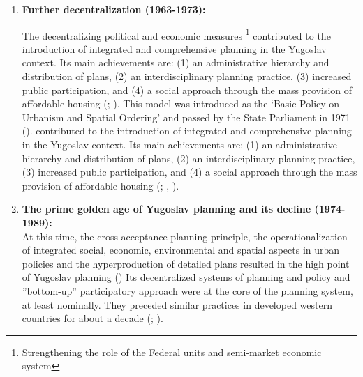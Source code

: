 \documentclass[11pt]{report}
\begin{document}
\begin{enumerate}
\item \textbf{Further decentralization (1963-1973):}

The decentralizing political and economic measures
\footnote{Strengthening the role of the Federal units and semi-market economic system}
contributed to the introduction of integrated and comprehensive planning in the Yugoslav context. Its main achievements are: (1) an administrative hierarchy and distribution of plans, (2) an interdisciplinary planning practice, (3) increased public participation, and (4) a social approach through the mass provision of affordable housing (\href{Vesna}{\citealt{cagic_zakoni_2014}}; \href{Peric}{ \citealt{peric_evolution_2016}}). This model was introduced as the ‘Basic Policy on Urbanism and Spatial Ordering’ and passed by the State Parliament in 1971 (\href{Nedovic}{\citealt{nedovicbudic_waves_2006}}).
contributed to the introduction of integrated and comprehensive planning in the Yugoslav context. Its main achievements are: (1) an administrative hierarchy and distribution of plans, (2) an interdisciplinary planning practice, (3) increased public participation, and (4) a social approach through the mass provision of affordable housing (\href{Simmie}{\citealt{simmie_self-management_1989}}; \href{Vujosevic}{\citealt{Vujosevic, 2003}}, \href{Peric}{\citealt{peric_evolution_2016}}).

\item \textbf{The prime golden age of Yugoslav planning and its decline (1974-1989):}
\\
At this  time, the cross-acceptance  planning  principle, the  operationalization  of  integrated social,  economic, environmental and spatial aspects in urban policies and the hyperproduction of detailed plans resulted in the high point of Yugoslav planning (\href{Nedovic}{\citealt{nedovic-budic_mornings_2011}})
Its decentralized systems of planning and policy and ”bottom-up” participatory approach were at the core of the planning system, at least nominally. They preceded similar practices in developed western countries for about a decade (\href{Cullingworth}{\citealt{cullingworth_planning_1997}}; \href{Vujosevic} {\citealt{vujosevic_collapse_2010}}).
\\


\end{enumerate}
\end{document}
